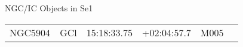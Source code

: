 \begin{block}{NGC/IC Objects in Se1}
  \centering
  \begin{tabularx}{\textwidth}{llrrll} \toprule 
    NGC5904 & GCl & 15:18:33.75 & +02:04:57.7  & M005 \\ 
  \end{tabularx}
\end{block}